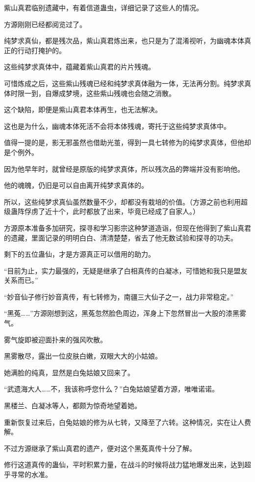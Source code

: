 \begin{this_body}
紫山真君临别遗藏中，有着信道蛊虫，详细记录了这些人的情况。

方源刚刚已经都阅览过了。

纯梦求真仙，都是残次品，紫山真君炼出来，也只是为了混淆视听，为幽魂本体真正的行动打掩护的。

这些纯梦求真体中，蕴藏着紫山真君的片片残魂。

可惜炼成之后，这些紫山残魂已经和纯梦求真体融为一体，无法再分割。纯梦求真体时限一到，自爆成梦境，这些紫山残魂也会随之消散。

这个缺陷，即便是紫山真君本体再生，也无法解决。

这也是为什么，幽魂本体死活不会将本体残魂，寄托于这些纯梦求真体中。

值得一提的是，影无邪虽然也借助光茧，得到一具七转修为的纯梦求真体，但他却是个例外。

因为他早年时，就曾经是原版的纯梦求真体，所以残次品的弊端并没有影响他。

他的魂魄，仍旧是可以自由离开纯梦求真体的。

所以，这些纯梦求真仙虽然数量不少，却都没有栽培的价值。（方源之前也利用超级蛊阵俘虏了近十个，此时都放了出来，毕竟已经成了自家人。）

方源原本准备多加研究，探寻和学习影宗这种梦道造诣，但现在他得到了紫山真君的遗藏，里面记录的明明白白、清清楚楚，省去了他无数试验和探寻的功夫。

剩下的五位蛊仙，才是方源真正可以借用的助力。

“目前为止，实力最强的，无疑是继承了白相真传的白凝冰，可惜她和我只是盟友关系而已。”

“妙音仙子修行妙音真传，有七转修为，南疆三大仙子之一，战力非常稳定。”

“黑菟……”方源刚想到这，黑菟忽然脸色周边，浑身上下忽然冒出一大股的漆黑雾气。

雾气旋即被迎面扑来的强风吹散。

黑雾散尽，露出一位皮肤白嫩，双眼大大的小姑娘。

她满脸的纯真，显然是白兔姑娘又回来了。

“武遗海大人……不，我该称呼您什么？”白兔姑娘望着方源，唯唯诺诺。

黑楼兰、白凝冰等人，都颇为惊奇地望着她。

重新恢复过来后，白兔姑娘的修为从七转，又降至了六转。这种情况，实在让人费解。

不过方源继承了紫山真君的遗产，便对这个黑菟真传十分了解。

修行这道真传的蛊仙，平时积累力量，在战斗的时候将战力猛地爆发出来，达到超乎寻常的水准。


\end{this_body}
